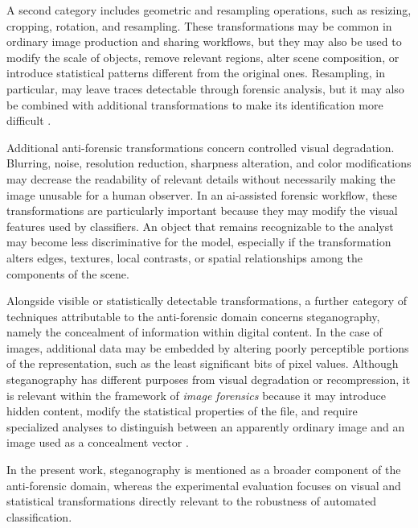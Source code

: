 A second category includes geometric and resampling operations, such as
resizing, cropping, rotation, and resampling. These transformations may be
common in ordinary image production and sharing workflows, but they may also be
used to modify the scale of objects, remove relevant regions, alter scene
composition, or introduce statistical patterns different from the original
ones. Resampling, in particular, may leave traces detectable through forensic
analysis, but it may also be combined with additional transformations to make
its identification more difficult \cite{popescu2005exposing,farid2016photo}.

Additional anti-forensic transformations concern controlled visual degradation.
Blurring, noise, resolution reduction, sharpness alteration, and color
modifications may decrease the readability of relevant details without
necessarily making the image unusable for a human observer. In an
\gls{ai}-assisted forensic workflow, these transformations are particularly
important because they may modify the visual features used by classifiers. An
object that remains recognizable to the analyst may become less discriminative
for the model, especially if the transformation alters edges, textures, local
contrasts, or spatial relationships among the components of the scene.

Alongside visible or statistically detectable transformations, a further
category of techniques attributable to the anti-forensic domain concerns
steganography, namely the concealment of information within digital content. In
the case of images, additional data may be embedded by altering poorly
perceptible portions of the representation, such as the least significant bits
of pixel values. Although steganography has different purposes from visual
degradation or recompression, it is relevant within the framework of
\textit{image forensics} because it may introduce hidden content, modify the
statistical properties of the file, and require specialized analyses to
distinguish between an apparently ordinary image and an image used as a
concealment vector \cite{stamm2013information,yaacoub2021digital}.

In the present work, steganography is mentioned as a broader component of the
anti-forensic domain, whereas the experimental evaluation focuses on visual and
statistical transformations directly relevant to the robustness of automated
classification.

